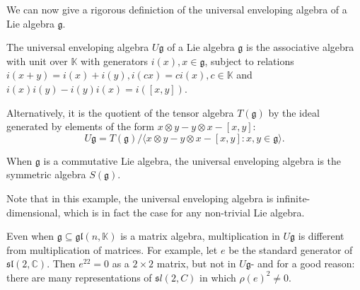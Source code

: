 \documentclass{report}
\begin{document}
We can now give a rigorous definiction of the universal enveloping algebra of a Lie algebra $\mathfrak g$.
\begin{definition}
    The universal enveloping algebra $U \mathfrak g$ of a Lie algebra $\mathfrak g$ is the associative algebra with unit over $\mathbb K$ with generators $i(x), x \in \mathfrak g$, subject to relations $i(x+y) = i(x)+i(y), i(c x) = ci(x), c \in \mathbb K $ and  $i(x) i(y) - i(y) i(x) = i([x,y])$.

    Alternatively, it is the quotient of the tensor algebra $T(\mathfrak g)$ by the ideal generated by elements of the form $x \otimes y - y \otimes x - [x,y]$:
    \[
    U \mathfrak g = T(\mathfrak g) / \langle x \otimes y - y \otimes x - [x,y] : x, y \in \mathfrak g \rangle.
    \]
\end{definition}

\begin{example}
    When $\mathfrak g$ is a commutative Lie algebra, the universal enveloping algebra is the symmetric algebra $S(\mathfrak g)$.
\end{example}
Note that in this example, the universal enveloping algebra is infinite-dimensional, which is in fact the case for any non-trivial Lie algebra.

\begin{remark}
    Even when $\mathfrak g \subseteq \mathfrak{gl}(n, \mathbb K)$ is a matrix algebra, multiplication in $U \mathfrak g$ is different from multiplication of matrices. For example, let $e$ be the standard generator of $\mathfrak{sl}(2, \mathbb C)$. 
    Then $e^22 = 0$ as a $2 \times 2$ matrix, but not in $U \mathfrak g$- and for a good reason: there are many representations of $\mathfrak sl(2, C)$ in which $\rho(e)^2 \neq 0$.
\end{remark}
\end{document}
